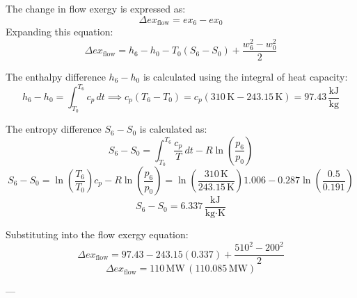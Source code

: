 The change in flow exergy is expressed as:  
\[
\Delta ex_{\text{flow}} = ex_{6} - ex_{0}
\]  
Expanding this equation:  
\[
\Delta ex_{\text{flow}} = h_6 - h_0 - T_0(S_6 - S_0) + \frac{w_6^2 - w_0^2}{2}
\]  

The enthalpy difference \( h_6 - h_0 \) is calculated using the integral of heat capacity:  
\[
h_6 - h_0 = \int_{T_0}^{T_6} c_p \, dt \implies c_p(T_6 - T_0) = c_p(310 \, \text{K} - 243.15 \, \text{K}) = 97.43 \, \frac{\text{kJ}}{\text{kg}}
\]  

The entropy difference \( S_6 - S_0 \) is calculated as:  
\[
S_6 - S_0 = \int_{T_0}^{T_6} \frac{c_p}{T} \, dt - R \ln \left( \frac{p_6}{p_0} \right)
\]  
\[
S_6 - S_0 = \ln \left( \frac{T_6}{T_0} \right) c_p - R \ln \left( \frac{p_6}{p_0} \right) = \ln \left( \frac{310 \, \text{K}}{243.15 \, \text{K}} \right) 1.006 - 0.287 \ln \left( \frac{0.5}{0.191} \right)
\]  
\[
S_6 - S_0 = 6.337 \, \frac{\text{kJ}}{\text{kg·K}}
\]  

Substituting into the flow exergy equation:  
\[
\Delta ex_{\text{flow}} = 97.43 - 243.15(0.337) + \frac{510^2 - 200^2}{2}
\]  
\[
\Delta ex_{\text{flow}} = 110 \, \text{MW} \, (110.085 \, \text{MW})
\]  

---